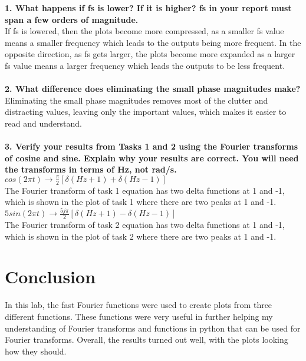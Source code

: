 \documentclass[12pt]{report}
\begin{document}
\textbf{1. What happens if fs is lower? If it is higher? fs in your report must span a few orders of magnitude.}
\\If fs is lowered, then the plots become more compressed, as a smaller fs value means a smaller frequency which leads to the outputs being more frequent. In the opposite direction, as fs gets larger, the plots become more expanded as a larger fs value means a larger frequency which leads the outputs to be less frequent.
\\
\\ \textbf{2. What difference does eliminating the small phase magnitudes make?}
\\ Eliminating the small phase magnitudes removes most of the clutter and distracting values, leaving only the important values, which makes it easier to read and understand.
\\
\\ \textbf{3. Verify your results from Tasks 1 and 2 using the Fourier transforms of cosine and sine. Explain why your results are correct. You will need the transforms in terms of Hz, not rad/s.}
\\ $cos(2\pi t) \rightarrow \frac{\pi}{2}[\delta (Hz + 1) + \delta (Hz - 1)]$
\\ The Fourier transform of task 1 equation has two delta functions at 1 and -1, which is shown in the plot of task 1 where there are two peaks at 1 and -1.
\\ $5sin(2\pi t) \rightarrow  \frac{5j\pi}{2}[\delta (Hz + 1) - \delta (Hz - 1)]$
\\ The Fourier transform of task 2 equation has two delta functions at 1 and -1, which is shown in the plot of task 2 where there are two peaks at 1 and -1.
\section{Conclusion}
In this lab, the fast Fourier functions were used to create plots from three different functions. These functions were very useful in further helping my understanding of Fourier transforms and functions in python that can be used for Fourier transforms. Overall, the results turned out well, with the plots looking how they should.
\end{document}

